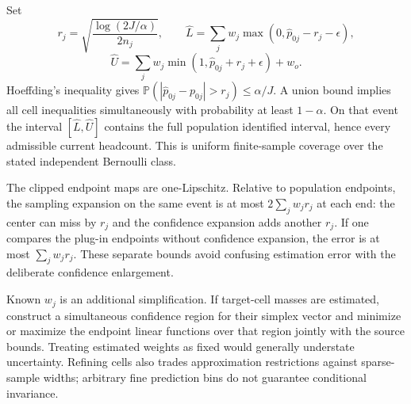 \documentclass[11pt,a4paper]{article}
\newcommand{\Prob}{\mathbb P}
\begin{document}
Set
\[
 r_j=\sqrt{\frac{\log(2J/\alpha)}{2n_j}},\qquad
 \widehat L=\sum_jw_j\max(0,\widehat p_{0j}-r_j-\epsilon),
\]
\[
 \widehat U=\sum_jw_j\min(1,\widehat p_{0j}+r_j+\epsilon)+w_o.
\tag{2}
\]
Hoeffding's inequality gives $\Prob(|\widehat p_{0j}-p_{0j}|>r_j)\le\alpha/J$. A union bound implies all cell inequalities simultaneously with probability at least $1-\alpha$. On that event the interval $[\widehat L,\widehat U]$ contains the full population identified interval, hence every admissible current headcount. This is uniform finite-sample coverage over the stated independent Bernoulli class.

The clipped endpoint maps are one-Lipschitz. Relative to population endpoints, the sampling expansion on the same event is at most $2\sum_jw_jr_j$ at each end: the center can miss by $r_j$ and the confidence expansion adds another $r_j$. If one compares the plug-in endpoints without confidence expansion, the error is at most $\sum_jw_jr_j$. These separate bounds avoid confusing estimation error with the deliberate confidence enlargement.

Known $w_j$ is an additional simplification. If target-cell masses are estimated, construct a simultaneous confidence region for their simplex vector and minimize or maximize the endpoint linear functions over that region jointly with the source bounds. Treating estimated weights as fixed would generally understate uncertainty. Refining cells also trades approximation restrictions against sparse-sample widths; arbitrary fine prediction bins do not guarantee conditional invariance.
\end{document}
